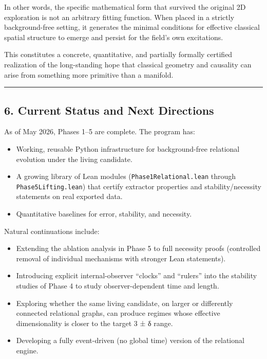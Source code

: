 \documentclass[
  11pt,
  a4paper,
]{article}
\providecommand{\tightlist}{%
  \setlength{\itemsep}{0pt}\setlength{\parskip}{0pt}}
\begin{document}
In other words, the specific mathematical form that survived the
original 2D exploration is not an arbitrary fitting function. When
placed in a strictly background-free setting, it generates the minimal
conditions for effective classical spatial structure to emerge and
persist for the field's own excitations.

This constitutes a concrete, quantitative, and partially formally
certified realization of the long-standing hope that classical geometry
and causality can arise from something more primitive than a manifold.

\begin{center}\rule{0.5\linewidth}{0.5pt}\end{center}

\subsection{6. Current Status and Next
Directions}\label{current-status-and-next-directions}

As of May 2026, Phases 1--5 are complete. The program has:

\begin{itemize}
\tightlist
\item
  Working, reusable Python infrastructure for background-free relational
  evolution under the living candidate.
\item
  A growing library of Lean modules (\texttt{Phase1Relational.lean}
  through \texttt{Phase5Lifting.lean}) that certify extractor properties
  and stability/necessity statements on real exported data.
\item
  Quantitative baselines for error, stability, and necessity.
\end{itemize}

Natural continuations include:

\begin{itemize}
\tightlist
\item
  Extending the ablation analysis in Phase 5 to full necessity proofs
  (controlled removal of individual mechanisms with stronger Lean
  statements).
\item
  Introducing explicit internal-observer ``clocks'' and ``rulers'' into
  the stability studies of Phase 4 to study observer-dependent time and
  length.
\item
  Exploring whether the same living candidate, on larger or differently
  connected relational graphs, can produce regimes whose effective
  dimensionality is closer to the target 3 ± δ range.
\item
  Developing a fully event-driven (no global time) version of the
  relational engine.
\end{itemize}
\end{document}
